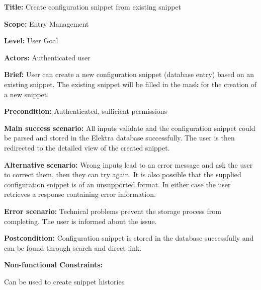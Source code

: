 
\begin{DoxyItemize}
\item {\bfseries{Title\+:}} Create configuration snippet from existing snippet
\item {\bfseries{Scope\+:}} Entry Management
\item {\bfseries{Level\+:}} User Goal
\item {\bfseries{Actors\+:}} Authenticated user
\item {\bfseries{Brief\+:}} User can create a new configuration snippet (database entry) based on an existing snippet. The existing snippet will be filled in the mask for the creation of a new snippet.
\end{DoxyItemize}


\begin{DoxyItemize}
\item {\bfseries{Precondition\+:}} Authenticated, sufficient permissions
\item {\bfseries{Main success scenario\+:}} All inputs validate and the configuration snippet could be parsed and stored in the Elektra database successfully. The user is then redirected to the detailed view of the created snippet.
\item {\bfseries{Alternative scenario\+:}} Wrong inputs lead to an error message and ask the user to correct them, then they can try again. It is also possible that the supplied configuration snippet is of an unsupported format. In either case the user retrieves a response containing error information.
\item {\bfseries{Error scenario\+:}} Technical problems prevent the storage process from completing. The user is informed about the issue.
\item {\bfseries{Postcondition\+:}} Configuration snippet is stored in the database successfully and can be found through search and direct link.
\item {\bfseries{Non-\/functional Constraints\+:}}
\begin{DoxyItemize}
\item Can be used to create snippet histories 
\end{DoxyItemize}
\end{DoxyItemize}